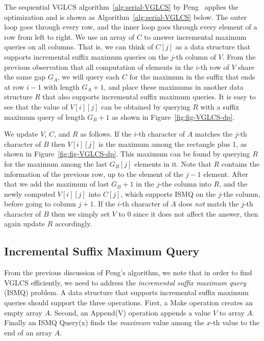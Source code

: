 The sequential VGLCS algorithm~\ref{alg:serial-VGLCS} by
Peng~\cite{Peng2011TheLC} applies the optimization and is shown as
Algorithm~\ref{alg:serial-VGLCS} below.  The outer loop goes through
every row, and the inner loop goes through every element of a row from
left to right.  We use an array of $C$ to answer incremental maximum
queries on all columns.  That is, we can think of $C[j]$ as a data
structure that supports incremental suffix maximum queries on the
$j$-th column of $V$.  From the previous observation that all
computation of elements in the $i$-th row of $V$ share the same gap
$G_A$, we will query each $C$ for the maximum in the suffix that ends
at row $i-1$ with length $G_A + 1$, and place these maximums in
another data structure $R$ that also supports incremental suffix
maximum queries.  It is easy to see that the value of $V[i][j]$ can be
obtained by querying $R$ with a suffix maximum query of length $G_B +
1$ as shown in Figure~\ref{fig:fig-VGLCS-dp}.

We update $V$, $C$, and $R$ as follows.  If the $i$-th character of
$A$ matches the $j$-th character of $B$ then $V[i][j]$ is the maximum
among the rectangle plus 1, as shown in Figure~\ref{fig:fig-VGLCS-dp}.
This maximum can be found by querying $R$ for the maximum among the
last $G_B[j]$ elements in it.  Note that $R$ contains the information
of the previous row, up to the element of the $j-1$ element.  After
that we add the maximum of last $G_B + 1$ in the $j$-the column into
$R$, and the newly computed $V[i][j]$ into $C[j]$, which supports ISMQ
on the $j$-the column, before going to column $j + 1$.  If the $i$-th
character of $A$ does {\em not} match the $j$-th character of $B$ then
we simply set $V$ to 0 since it does not affect the answer, then again
update $R$ accordingly.
 


\subsection{Incremental Suffix Maximum Query}

From the previous discussion of Peng's algorithm, we note that in
order to find VGLCS efficiently, we need to address the {\em
  incremental suffix maximum query} (ISMQ) problem.  A data structure
that supports incremental suffix maximum queries should support the
three operations.  First, a {\sc Make} operation creates an empty
array $A$. Second, an {\sc Append(V)} operation appends a value $V$ to
array $A$. Finally an ISMQ {\sc Query(x)} finds the {\em maximum}
value among the $x$-th value to the end of an array $A$.

